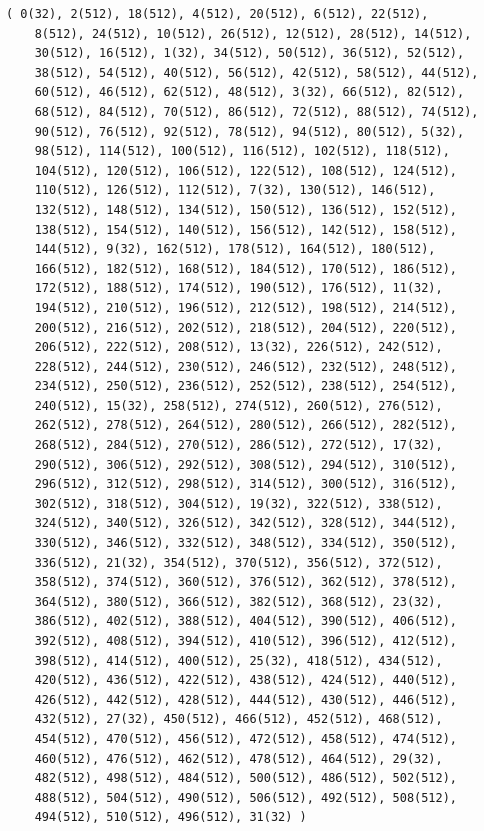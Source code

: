 \documentclass[a4paper,11pt]{report}
\begin{document}
{{\begin{Verbatim}[commandchars=!@A,fontsize=\small,frame=single,label=Example]
  ( 0(32), 2(512), 18(512), 4(512), 20(512), 6(512), 22(512), 
    8(512), 24(512), 10(512), 26(512), 12(512), 28(512), 14(512), 
    30(512), 16(512), 1(32), 34(512), 50(512), 36(512), 52(512), 
    38(512), 54(512), 40(512), 56(512), 42(512), 58(512), 44(512), 
    60(512), 46(512), 62(512), 48(512), 3(32), 66(512), 82(512), 
    68(512), 84(512), 70(512), 86(512), 72(512), 88(512), 74(512), 
    90(512), 76(512), 92(512), 78(512), 94(512), 80(512), 5(32), 
    98(512), 114(512), 100(512), 116(512), 102(512), 118(512), 
    104(512), 120(512), 106(512), 122(512), 108(512), 124(512), 
    110(512), 126(512), 112(512), 7(32), 130(512), 146(512), 
    132(512), 148(512), 134(512), 150(512), 136(512), 152(512), 
    138(512), 154(512), 140(512), 156(512), 142(512), 158(512), 
    144(512), 9(32), 162(512), 178(512), 164(512), 180(512), 
    166(512), 182(512), 168(512), 184(512), 170(512), 186(512), 
    172(512), 188(512), 174(512), 190(512), 176(512), 11(32), 
    194(512), 210(512), 196(512), 212(512), 198(512), 214(512), 
    200(512), 216(512), 202(512), 218(512), 204(512), 220(512), 
    206(512), 222(512), 208(512), 13(32), 226(512), 242(512), 
    228(512), 244(512), 230(512), 246(512), 232(512), 248(512), 
    234(512), 250(512), 236(512), 252(512), 238(512), 254(512), 
    240(512), 15(32), 258(512), 274(512), 260(512), 276(512), 
    262(512), 278(512), 264(512), 280(512), 266(512), 282(512), 
    268(512), 284(512), 270(512), 286(512), 272(512), 17(32), 
    290(512), 306(512), 292(512), 308(512), 294(512), 310(512), 
    296(512), 312(512), 298(512), 314(512), 300(512), 316(512), 
    302(512), 318(512), 304(512), 19(32), 322(512), 338(512), 
    324(512), 340(512), 326(512), 342(512), 328(512), 344(512), 
    330(512), 346(512), 332(512), 348(512), 334(512), 350(512), 
    336(512), 21(32), 354(512), 370(512), 356(512), 372(512), 
    358(512), 374(512), 360(512), 376(512), 362(512), 378(512), 
    364(512), 380(512), 366(512), 382(512), 368(512), 23(32), 
    386(512), 402(512), 388(512), 404(512), 390(512), 406(512), 
    392(512), 408(512), 394(512), 410(512), 396(512), 412(512), 
    398(512), 414(512), 400(512), 25(32), 418(512), 434(512), 
    420(512), 436(512), 422(512), 438(512), 424(512), 440(512), 
    426(512), 442(512), 428(512), 444(512), 430(512), 446(512), 
    432(512), 27(32), 450(512), 466(512), 452(512), 468(512), 
    454(512), 470(512), 456(512), 472(512), 458(512), 474(512), 
    460(512), 476(512), 462(512), 478(512), 464(512), 29(32), 
    482(512), 498(512), 484(512), 500(512), 486(512), 502(512), 
    488(512), 504(512), 490(512), 506(512), 492(512), 508(512), 
    494(512), 510(512), 496(512), 31(32) )
  

\end{Verbatim}}}
\end{document}
